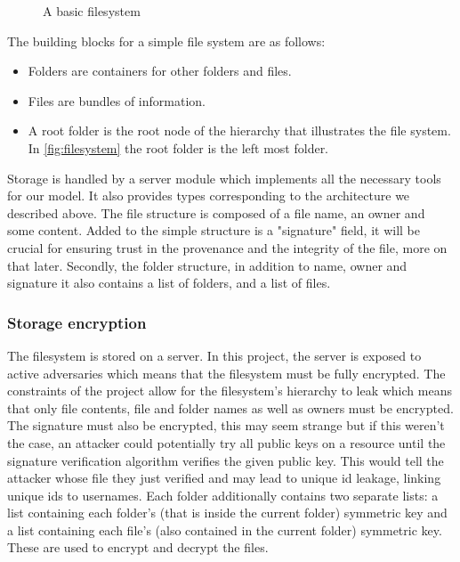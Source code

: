 \begin{minipage}{1\textwidth}
    \begin{figure}[H]
        \centering
        
        \caption{\label{fig:filesystem} A basic filesystem }
    \end{figure}
\end{minipage}

The building blocks for a simple file system are as follows:
\begin{itemize}
    \item Folders are containers for other folders and files.
    \item Files are bundles of information.
    \item A root folder is the root node of the hierarchy that illustrates the file system. In \autoref{fig:filesystem} the root folder is the left most folder.
\end{itemize}

Storage is handled by a server module which implements all the necessary tools for our model. It also provides types corresponding to the architecture we described above. The file structure is composed of a file name, an owner and some content. Added to the simple structure is a "signature" field, it will be crucial for ensuring trust in the provenance and the integrity of the file, more on that later. Secondly, the folder structure, in addition to name, owner and signature it also contains a list of folders, and a list of files.

\subsubsection{Storage encryption}
The filesystem is stored on a server. In this project, the server is exposed to active adversaries which means that the filesystem must be fully encrypted. The constraints of the project allow for the filesystem's hierarchy to leak which means that only file contents, file and folder names as well as owners must be encrypted. The signature must also be encrypted, this may seem strange but if this weren't the case, an attacker could potentially try all public keys on a resource until the signature verification algorithm verifies the given public key. This would tell the attacker whose file they just verified and may lead to unique id leakage, linking unique ids to usernames. Each folder additionally contains two separate lists: a list containing each folder's (that is inside the current folder) symmetric key and a list containing each file's (also contained in the current folder) symmetric key. These are used to encrypt and decrypt the files. 


